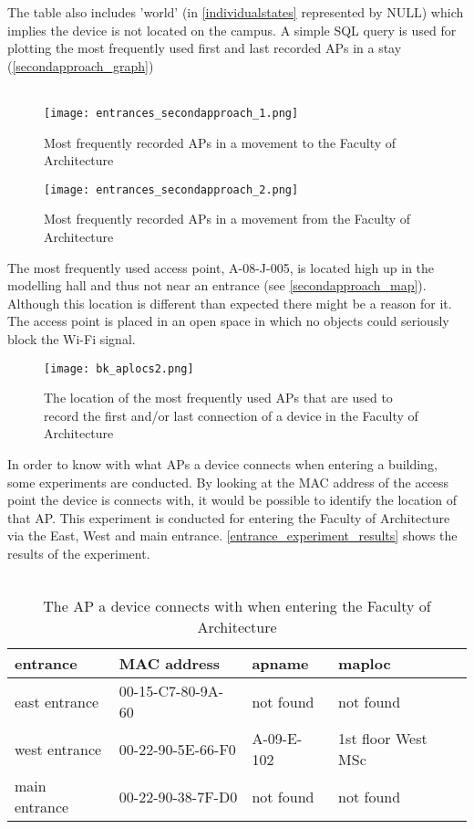 The table also includes ’world’ (in \autoref{individualstates} represented by NULL) which implies the device is not located on the campus. A simple SQL query is used for plotting the most frequently used first and last recorded APs in a stay (\autoref{secondapproach_graph})\\\\
\begin{figure}[H]
	\centering
	\texttt{[image: entrances\_secondapproach\_1.png]}
	\captionsetup{justification=centering}
	\caption{Most frequently recorded APs in a movement to the Faculty of Architecture}
	\label{secondapproach_graph}
\end{figure}
\begin{figure}[H]
	\centering
	\texttt{[image: entrances\_secondapproach\_2.png]}
	\captionsetup{justification=centering}
	\caption{Most frequently recorded APs in a movement from the Faculty of Architecture}
	\label{secondapproach_graph}
\end{figure}
The most frequently used access point, A-08-J-005, is located high up in the modelling hall and thus not near an entrance (see \autoref{secondapproach_map}). Although this location is different than expected there might be a reason for it. The access point is placed in an open space in which no objects could seriously block the Wi-Fi signal.
\begin{figure}[H]
	\centering
	\texttt{[image: bk\_aplocs2.png]}
	\captionsetup{justification=centering}
	\caption{The location of the most frequently used APs that are used to record the first and/or last connection of a device in the Faculty of Architecture}
	\label{secondapproach_map}
\end{figure}
In order to know with what APs a device connects when entering a building, some experiments are conducted. By looking at the MAC address of the access point the device is connects with, it would be possible to identify the location of that AP. This experiment is conducted for entering the Faculty of Architecture via the East, West and main entrance. \autoref{entrance_experiment_results} shows the results of the experiment.\\\\
\begin{table}[H]
	\centering
	\captionsetup{justification=centering}
	\caption{The AP a device connects with when entering the Faculty of Architecture}
	\label{entrance_experiment_results}
	\begin{tabular}{@{}llll@{}}
		\toprule
		\textbf{entrance} & \textbf{MAC address} & \textbf{apname} & \textbf{maploc}    \\ \midrule
		east entrance     & 00-15-C7-80-9A-60    & not found       & not found          \\
		west entrance     & 00-22-90-5E-66-F0    & A-09-E-102      & 1st floor West MSc \\
		main entrance     & 00-22-90-38-7F-D0    & not found       & not found          \\ \bottomrule
	\end{tabular}
\end{table}
